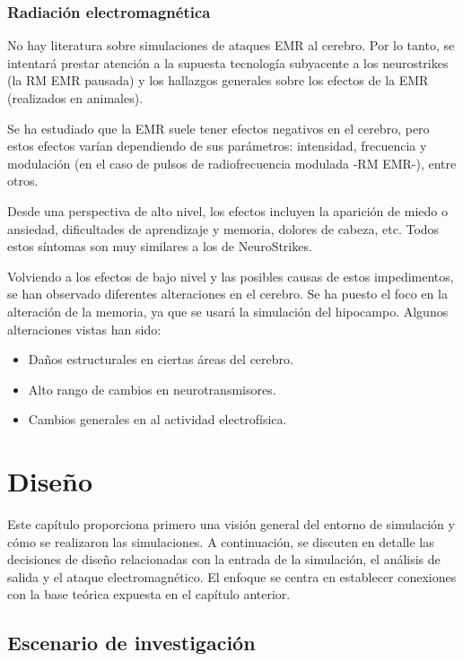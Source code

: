 \documentclass[12pt, letterpaper]{article}
\begin{document}
\subsubsection{Radiación electromagnética}
No hay literatura sobre simulaciones de ataques EMR al cerebro. Por lo tanto, se intentará prestar atención a la supuesta tecnología subyacente a los neurostrikes (la RM EMR pausada) y los hallazgos generales sobre los efectos de la EMR (realizados en animales).

Se ha estudiado que la EMR suele tener efectos negativos en el cerebro, pero estos efectos varían dependiendo de sus parámetros: intensidad, frecuencia y modulación (en el caso de pulsos de radiofrecuencia modulada -RM EMR-), entre otros. 

Desde una perspectiva de alto nivel, los efectos incluyen la aparición de miedo o ansiedad, dificultades de aprendizaje y memoria, dolores de cabeza, etc. Todos estos síntomas son muy similares a los de NeuroStrikes. 

Volviendo a los efectos de bajo nivel y las posibles causas de estos impedimentos, se han observado diferentes alteraciones en el cerebro. Se ha puesto el foco en la alteración de la memoria, ya que se usará la simulación del hipocampo. Algunos alteraciones vistas han sido:
\begin{itemize}
    \item Daños estructurales en ciertas áreas del cerebro.
    \item Alto rango de cambios en neurotransmisores.
    \item Cambios generales en al actividad electrofísica.
\end{itemize}

\section{Diseño}


Este capítulo proporciona primero una visión general del entorno de simulación y cómo se realizaron las simulaciones. A continuación, se discuten en detalle las decisiones de diseño relacionadas con la entrada de la simulación, el análisis de salida y el ataque electromagnético. El enfoque se centra en establecer conexiones con la base teórica expuesta en el capítulo anterior.

\subsection{Escenario de investigación}
\end{document}
